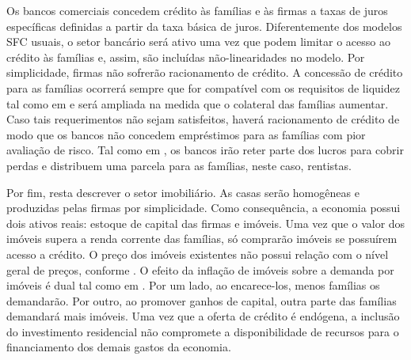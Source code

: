 Os bancos comerciais concedem crédito às famílias e às firmas a taxas de juros específicas definidas a partir da taxa básica de juros.
Diferentemente dos modelos SFC usuais, o setor bancário será ativo uma vez que podem limitar o acesso ao crédito às famílias e, assim, são incluídas não-linearidades no modelo.
Por simplicidade, firmas não sofrerão racionamento de crédito. 
A concessão de crédito para as famílias ocorrerá sempre que for compatível com os requisitos de liquidez tal como em \textcite{dawid_bubbles_2015} e será ampliada na medida que o colateral das famílias aumentar.
Caso tais requerimentos não sejam satisfeitos, haverá racionamento de crédito de modo que os bancos não concedem empréstimos para as famílias com pior avaliação de risco. %
Tal como em \textcite[Capítulo 11]{godley_monetary_2007}, os bancos irão reter parte dos lucros para cobrir perdas e distribuem uma parcela para as famílias, neste caso, rentistas.

Por fim, resta descrever o setor imobiliário. 
As casas serão homogêneas e  produzidas pelas firmas por simplicidade. 
Como consequência, a economia possui dois ativos reais: estoque de capital das firmas e imóveis.
Uma vez que o valor dos imóveis supera a renda corrente das famílias, só comprarão imóveis se possuírem acesso a crédito.
O preço dos imóveis existentes não possui relação com o nível geral de preços, conforme \textcite{zezza_u.s._2008}.
O efeito da inflação de imóveis sobre a demanda por imóveis é dual tal como em \textcite{duesenberry_investment_1958}. 
Por um lado, ao encarece-los, menos famílias  os demandarão.
Por outro, ao promover ganhos de capital, outra parte das famílias demandará mais imóveis.
Uma vez que a oferta de crédito é endógena, a inclusão do investimento residencial não compromete a disponibilidade de recursos para o financiamento dos demais gastos da economia. %


